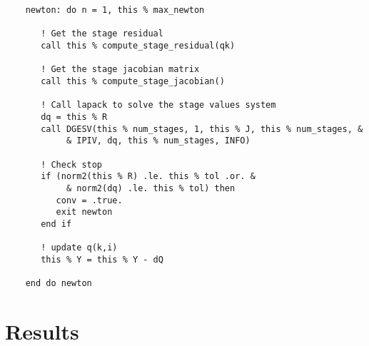 \documentclass[pdftex,11pt,letter]{article}
\begin{document}
\begin{verbatim}
    newton: do n = 1, this % max_newton
       
       ! Get the stage residual
       call this % compute_stage_residual(qk)
       
       ! Get the stage jacobian matrix
       call this % compute_stage_jacobian()

       ! Call lapack to solve the stage values system
       dq = this % R
       call DGESV(this % num_stages, 1, this % J, this % num_stages, &
            & IPIV, dq, this % num_stages, INFO)

       ! Check stop
       if (norm2(this % R) .le. this % tol .or. &
            & norm2(dq) .le. this % tol) then
          conv = .true.
          exit newton
       end if
       
       ! update q(k,i)
       this % Y = this % Y - dQ
       
    end do newton
\end{verbatim}

\section{Results}
\end{document}
